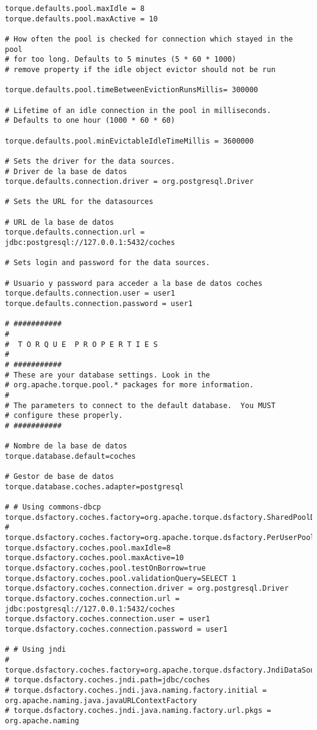 \begin{lstlisting}
torque.defaults.pool.maxIdle = 8
torque.defaults.pool.maxActive = 10

# How often the pool is checked for connection which stayed in the pool
# for too long. Defaults to 5 minutes (5 * 60 * 1000)
# remove property if the idle object evictor should not be run

torque.defaults.pool.timeBetweenEvictionRunsMillis= 300000

# Lifetime of an idle connection in the pool in milliseconds.
# Defaults to one hour (1000 * 60 * 60)

torque.defaults.pool.minEvictableIdleTimeMillis = 3600000

# Sets the driver for the data sources.
# Driver de la base de datos
torque.defaults.connection.driver = org.postgresql.Driver

# Sets the URL for the datasources

# URL de la base de datos
torque.defaults.connection.url = jdbc:postgresql://127.0.0.1:5432/coches

# Sets login and password for the data sources.

# Usuario y password para acceder a la base de datos coches
torque.defaults.connection.user = user1
torque.defaults.connection.password = user1

# ###########
#
#  T O R Q U E  P R O P E R T I E S
#
# ###########
# These are your database settings. Look in the
# org.apache.torque.pool.* packages for more information.
#
# The parameters to connect to the default database.  You MUST
# configure these properly.
# ###########

# Nombre de la base de datos
torque.database.default=coches

# Gestor de base de datos
torque.database.coches.adapter=postgresql

# # Using commons-dbcp
torque.dsfactory.coches.factory=org.apache.torque.dsfactory.SharedPoolDataSourceFactory
# torque.dsfactory.coches.factory=org.apache.torque.dsfactory.PerUserPoolDataSourceFactory
torque.dsfactory.coches.pool.maxIdle=8
torque.dsfactory.coches.pool.maxActive=10
torque.dsfactory.coches.pool.testOnBorrow=true
torque.dsfactory.coches.pool.validationQuery=SELECT 1
torque.dsfactory.coches.connection.driver = org.postgresql.Driver
torque.dsfactory.coches.connection.url = jdbc:postgresql://127.0.0.1:5432/coches
torque.dsfactory.coches.connection.user = user1
torque.dsfactory.coches.connection.password = user1

# # Using jndi
# torque.dsfactory.coches.factory=org.apache.torque.dsfactory.JndiDataSourceFactory
# torque.dsfactory.coches.jndi.path=jdbc/coches
# torque.dsfactory.coches.jndi.java.naming.factory.initial = org.apache.naming.java.javaURLContextFactory
# torque.dsfactory.coches.jndi.java.naming.factory.url.pkgs = org.apache.naming


\end{lstlisting}
